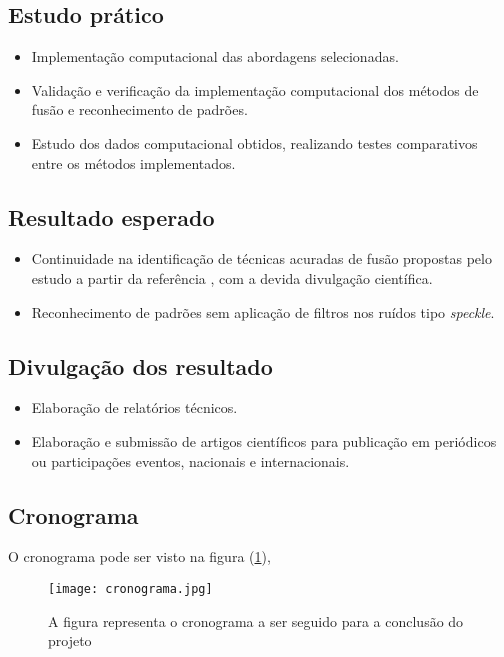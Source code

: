 \documentclass[runningheads]{llncs}
\begin{document}
\subsection{Estudo prático}

\begin{itemize}
  \item Implementação computacional das abordagens selecionadas.
  \item Validação e verificação da implementação computacional dos métodos de fusão e reconhecimento de padrões.
  \item Estudo dos dados computacional obtidos, realizando testes comparativos entre os métodos implementados.
\end{itemize}

\subsection{Resultado esperado}

\begin{itemize}
  \item Continuidade na identificação de técnicas acuradas de fusão propostas pelo estudo a partir da referência \cite{bmf_2020}, com a devida divulgação científica.
  \item Reconhecimento de padrões sem aplicação de filtros nos ruídos tipo \textit{speckle}.
\end{itemize}

\subsection{Divulgação dos resultado}

\begin{itemize}
  \item Elaboração de relatórios técnicos.
  \item Elaboração e submissão de artigos científicos para publicação em periódicos ou participações eventos, nacionais e internacionais.
\end{itemize}
\subsection{Cronograma}
O cronograma pode ser visto na figura (\ref{fig1}),
\begin{figure}[h!]
\begin{center}
\texttt{[image: cronograma.jpg]}
\end{center}
\caption{A figura representa o cronograma a ser seguido para a conclusão do projeto} \label{fig1}
\end{figure}
\end{document}
